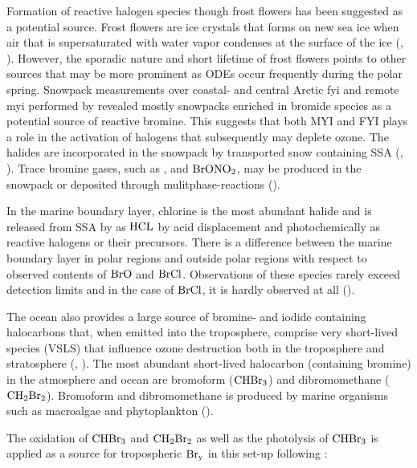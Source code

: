 \medskip

Formation of reactive halogen species though frost flowers has been suggested as a potential source. Frost flowers are ice crystals that forms on new sea ice when air that is supersaturated with water vapor condenses at the surface of the ice (\cite{GRANFORS2013124}, \cite{Kaleschke}). However, the sporadic nature and short lifetime of frost flowers points to other sources that may be more prominent as ODEs occur frequently during the polar spring. Snowpack measurements over coastal- and central Arctic \acrfull{fyi} and remote \acrfull{myi} performed by \cite{Peterson2019} revealed mostly snowpacks enriched in bromide species as a potential source of reactive bromine. This suggests that both MYI and FYI plays a role in the activation of halogens that subsequently may deplete ozone. The halides are incorporated in the snowpack by transported snow containing SSA (\cite{Toyota}, \cite{Peterson2019}). Trace bromine gases, such as ,  and $\mathrm{BrONO_2}$, may be produced in the snowpack or deposited through mulitphase-reactions (\cite{Simpson2005}). 


\medskip


In the marine boundary layer, chlorine is the most abundant halide and is released from SSA by as $\mathrm{HCL}$ by acid displacement and photochemically as reactive halogens or their precursors. There is a difference between the marine boundary layer in polar regions and outside polar regions with respect to observed contents of $\mathrm{BrO}$ and $\mathrm{BrCl}$. Observations of these species rarely exceed detection limits and in the case of $\mathrm{BrCl}$, it is hardly observed at all (\cite{Simpson2015}). 

\medskip

The ocean also provides a large source of bromine- and iodide containing halocarbons that, when emitted into the troposphere, comprise very short-lived species (VSLS) that influence ozone destruction both in the troposphere and stratosphere (\cite{ziska}, \cite{Simpson2015}). The most abundant short-lived halocarbon (containing bromine) in the atmosphere and ocean are bromoform ($\mathrm{CHBr_3}$) and dibromomethane ($\mathrm{CH_2Br_2}$). Bromoform and dibromomethane is produced by marine organisms such as macroalgae and phytoplankton (\cite{Quack2003}).


\medskip

The oxidation of $\mathrm{CHBr_3}$ and $\mathrm{CH_2Br_2}$ as well as the photolysis of $\mathrm{CHBr_3}$ is applied as a source for tropospheric $\mathrm{Br_y}$ in this set-up following \cite{Parella}:


